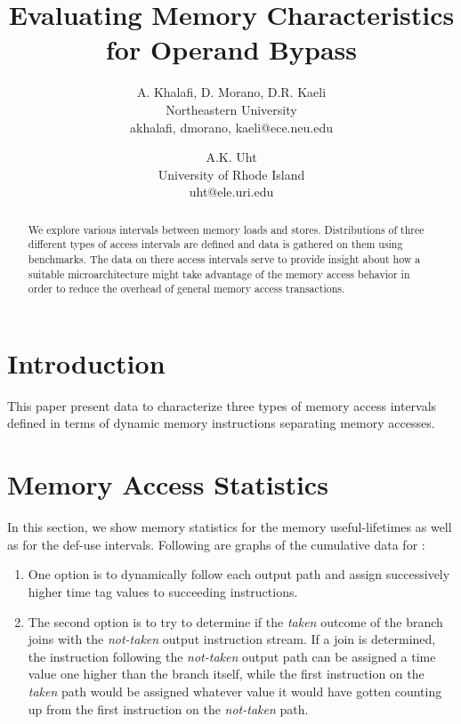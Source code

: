\documentclass[10pt,twocolumn]{article}
\begin{document}
%
%
%
\title{Evaluating Memory Characteristics for Operand Bypass}
%
\author{
A. Khalafi, D. Morano, D.R. Kaeli\\
Northeastern University\\
{akhalafi, dmorano, kaeli}@ece.neu.edu\\
\and
A.K. Uht\\
University of Rhode Island\\ 
uht@ele.uri.edu
}
%
%
\date{}
%
\maketitle
%
%
%
\begin{abstract}
%
We explore various intervals between memory loads and stores.
Distributions of three different types of access intervals
are defined and data is gathered on them using benchmarks.
The data on there access intervals serve to provide insight
about how a suitable microarchitecture might take advantage
of the memory access behavior in order to reduce the overhead
of general memory access transactions.
%
\end{abstract}
%
%
\vspace{-0.25in}
\section{Introduction}
\vspace{-0.15in}
%
This paper present data to characterize three types of
memory access intervals defined in terms of dynamic memory
instructions separating memory accesses.




%
%
\vspace{-0.25in}
\section{Memory Access Statistics}
\vspace{-0.15in}
%
In this section, we show memory statistics for
the memory useful-lifetimes as well as for the def-use intervals.
Following are graphs of the cumulative data for :

\begin{enumerate}
\item One option is to dynamically follow
each output path and assign successively higher time tag values
to succeeding instructions.
\vspace{-0.15in}
\item The second option is to try to determine if the \textit{taken} outcome
of the branch joins with the \textit{not-taken} output instruction
stream.  If a join is determined, the instruction following
the \textit{not-taken} output path can be assigned a time value
one higher than the branch itself, while the first instruction
on the \textit{taken} path would be assigned whatever value
it would have gotten counting up from the first instruction
on the \textit{not-taken} path.
\end{enumerate}
\end{document}
